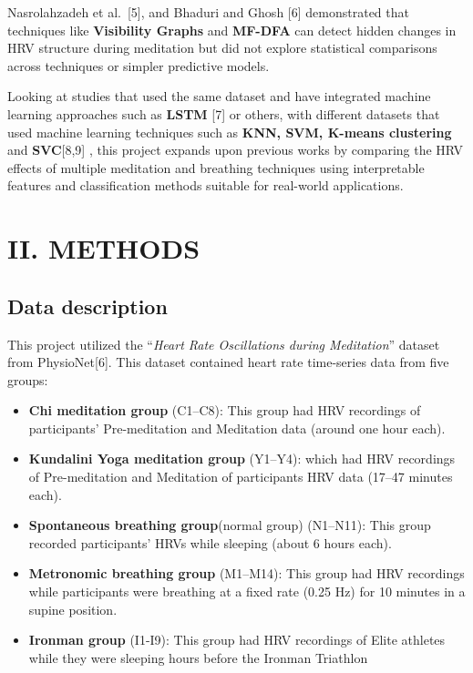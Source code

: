 \documentclass[
  11pt,
]{ieee}
\begin{document}
Nasrolahzadeh et al.~{[}5{]}, and Bhaduri and Ghosh {[}6{]} demonstrated
that techniques like \textbf{Visibility Graphs} and \textbf{MF-DFA} can
detect hidden changes in HRV structure during meditation but did not
explore statistical comparisons across techniques or simpler predictive
models.

Looking at studies that used the same dataset and have integrated
machine learning approaches such as \textbf{LSTM} {[}7{]} or others,
with different datasets that used machine learning techniques such as
\textbf{KNN, SVM, K-means clustering} and \textbf{SVC}{[}8,9{]} , this
project expands upon previous works by comparing the HRV effects of
multiple meditation and breathing techniques using interpretable
features and classification methods suitable for real-world
applications.

\section{II. METHODS}\label{ii.-methods}

\subsection{Data description}\label{data-description}

\vspace{0.8em}

This project utilized the ``\emph{Heart Rate Oscillations during
Meditation}'' dataset from PhysioNet{[}6{]}. This dataset contained
heart rate time-series data from five groups:

\begin{itemize}
\item
  \textbf{Chi meditation group} (C1--C8): This group had HRV recordings
  of participants' Pre-meditation and Meditation data (around one hour
  each).
\item
  \textbf{Kundalini Yoga meditation group} (Y1--Y4): which had HRV
  recordings of Pre-meditation and Meditation of participants HRV data
  (17--47 minutes each).
\item
  \textbf{Spontaneous breathing group}(normal group) (N1--N11): This
  group recorded participants' HRVs while sleeping (about 6 hours each).
\item
  \textbf{Metronomic breathing group} (M1--M14): This group had HRV
  recordings while participants were breathing at a fixed rate (0.25 Hz)
  for 10 minutes in a supine position.
\item
  \textbf{Ironman group} (I1-I9): This group had HRV recordings of Elite
  athletes while they were sleeping hours before the Ironman Triathlon
\end{itemize}
\end{document}
